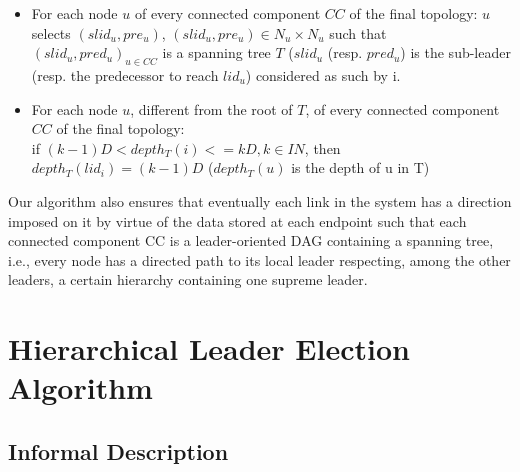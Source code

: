 \documentclass{article}
\begin{document}
\begin{itemize}
\item For each node $u$ of every connected component $CC$ of the final topology:
$u$ selects $(slid_u, pre_u)$, ${(slid_u, pre_u) \in N_u \times N_u}$ such that ${(slid_u, pred_u)}_{u \in CC}$ is a spanning tree $T$ ($slid_u$ (resp. $pred_u$) is the sub-leader (resp. the predecessor to reach $lid_u$) considered as such by i.
\item For each node $u$, different from the root of $T$, of every connected component $CC$ of the final topology:\\
if $ (k-1)D < depth_T (i) <= kD, k \in IN $, then $ depth_T(lid_i)=(k-1)D$ ($depth_T(u)$ is the depth of u in T)
\end{itemize}



Our algorithm also ensures that eventually each link in the system has a direction imposed on it by virtue of the data stored at each endpoint such that each connected component CC is a leader-oriented DAG containing a spanning tree, i.e., every node has a directed path to its local leader respecting, among the other leaders, a certain hierarchy containing one supreme leader.

\newpage

\section{Hierarchical Leader Election Algorithm}
\newpage
\subsection{Informal Description}
\end{document}
